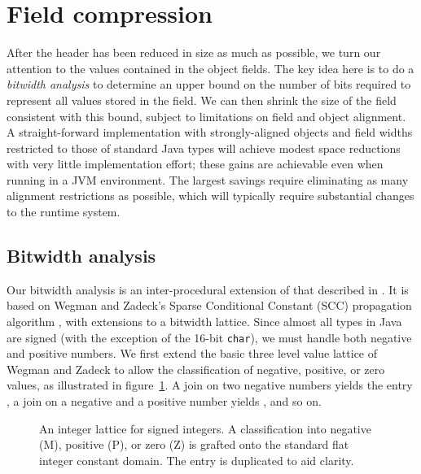 \documentclass[preprint]{acmconf}
\newcommand{\figscale}{1.0}
\begin{document}
\section{Field compression}
After the header has been reduced in size as much as possible, we turn
our attention to the values contained in the object fields.
The key idea here is to
do a {\it bitwidth analysis} \cite{ananian99:tech,stephenson00}
to determine an upper bound on
the number of bits required to represent all values stored in
the field.  We can then shrink the size of the field consistent with
this bound, subject to
limitations on field and object alignment.  
A straight-forward implementation with strongly-aligned objects and
field widths restricted to those of standard Java types will achieve
modest space reductions with very little implementation effort; these
gains are achievable even when running in a JVM environment.
The largest savings require eliminating as many alignment restrictions
as possible, which will typically require substantial changes to the
runtime system.

\subsection{Bitwidth analysis}
Our bitwidth analysis is an inter-procedural extension of that
described in \cite{ananian99:tech}.  It is based on Wegman and
Zadeck's Sparse Conditional Constant (SCC) propagation algorithm
\cite{wegman91:scc}, with extensions to a bitwidth lattice.
Since almost all types in Java are signed (with the exception of the
16-bit {\tt char}), we must handle both negative and positive numbers.
We first extend the basic three level value lattice of Wegman and
Zadeck to allow the classification of negative, positive, or zero
values, as illustrated in figure~\ref{fig:scclat6}.
A join on two negative numbers yields the entry , a
join on a negative and a positive number yields , and so on.
\begin{figure}
\centering\renewcommand{\figscale}{0.6}
\caption[An integer lattice for signed integers.]
{An integer lattice for signed integers. A classification into
negative (M), positive (P), or zero (Z) is grafted onto the standard
flat integer constant domain.  The  entry is duplicated to
aid clarity.}
\label{fig:scclat6}
\end{figure}
\end{document}

